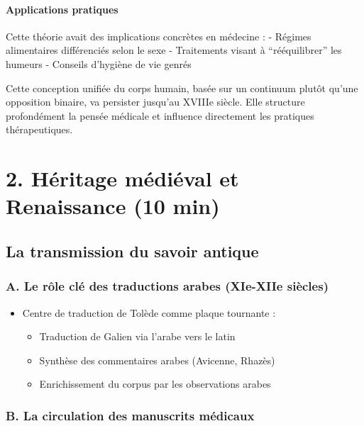 \documentclass[
  letterpaper,
  DIV=11,
  numbers=noendperiod]{scrreprt}
\providecommand{\tightlist}{%
  \setlength{\itemsep}{0pt}\setlength{\parskip}{0pt}}\usepackage{longtable,booktabs,array}
\begin{document}
\subsubsection{Applications pratiques}\label{applications-pratiques}

Cette théorie avait des implications concrètes en médecine : - Régimes
alimentaires différenciés selon le sexe - Traitements visant à
``rééquilibrer'' les humeurs - Conseils d'hygiène de vie genrés

Cette conception unifiée du corps humain, basée sur un continuum plutôt
qu'une opposition binaire, va persister jusqu'au XVIIIe siècle. Elle
structure profondément la pensée médicale et influence directement les
pratiques thérapeutiques.


\chapter{2. Héritage médiéval et Renaissance (10
min)}\label{huxe9ritage-muxe9diuxe9val-et-renaissance-10-min}

\section{La transmission du savoir
antique}\label{la-transmission-du-savoir-antique}

\subsection{A. Le rôle clé des traductions arabes (XIe-XIIe
siècles)}\label{a.-le-ruxf4le-cluxe9-des-traductions-arabes-xie-xiie-siuxe8cles}

\begin{itemize}
\tightlist
\item
  Centre de traduction de Tolède comme plaque tournante :

  \begin{itemize}
  \tightlist
  \item
    Traduction de Galien via l'arabe vers le latin
  \item
    Synthèse des commentaires arabes (Avicenne, Rhazès)
  \item
    Enrichissement du corpus par les observations arabes
  \end{itemize}
\end{itemize}

\subsection{B. La circulation des manuscrits
médicaux}\label{b.-la-circulation-des-manuscrits-muxe9dicaux}
\end{document}
